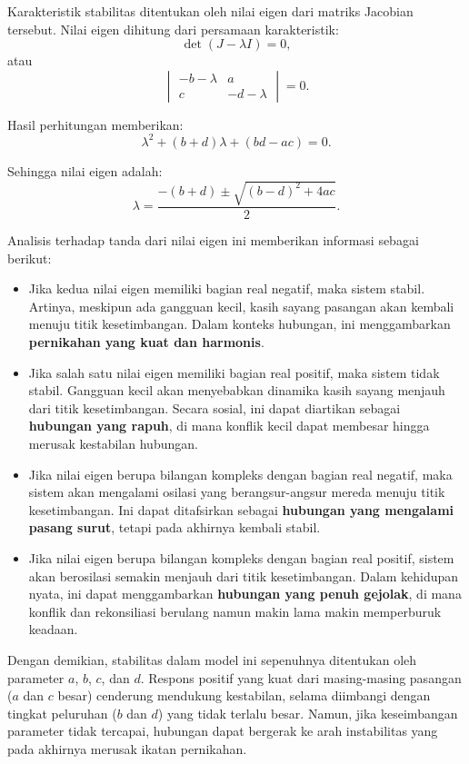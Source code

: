 \documentclass{bukumjh}
\begin{document}
Karakteristik stabilitas ditentukan oleh nilai eigen dari matriks Jacobian tersebut. 
Nilai eigen dihitung dari persamaan karakteristik:
\[
\det(J - \lambda I) = 0,
\]
atau
\[
\begin{vmatrix}
-b - \lambda & a \\
c & -d - \lambda
\end{vmatrix} = 0.
\]

Hasil perhitungan memberikan:
\[
\lambda^2 + (b+d)\lambda + (bd - ac) = 0.
\]

Sehingga nilai eigen adalah:
\[
\lambda = \frac{-(b+d) \pm \sqrt{(b-d)^2 + 4ac}}{2}.
\]

Analisis terhadap tanda dari nilai eigen ini memberikan informasi sebagai berikut:
\begin{itemize}
  \item Jika kedua nilai eigen memiliki bagian real negatif, maka sistem stabil. 
  Artinya, meskipun ada gangguan kecil, kasih sayang pasangan akan kembali menuju titik kesetimbangan. 
  Dalam konteks hubungan, ini menggambarkan \textbf{pernikahan yang kuat dan harmonis}.
  \item Jika salah satu nilai eigen memiliki bagian real positif, maka sistem tidak stabil. 
  Gangguan kecil akan menyebabkan dinamika kasih sayang menjauh dari titik kesetimbangan. 
  Secara sosial, ini dapat diartikan sebagai \textbf{hubungan yang rapuh}, di mana konflik kecil dapat membesar hingga merusak kestabilan hubungan.
  \item Jika nilai eigen berupa bilangan kompleks dengan bagian real negatif, maka sistem akan mengalami osilasi yang berangsur-angsur mereda menuju titik kesetimbangan. 
  Ini dapat ditafsirkan sebagai \textbf{hubungan yang mengalami pasang surut}, tetapi pada akhirnya kembali stabil.
  \item Jika nilai eigen berupa bilangan kompleks dengan bagian real positif, sistem akan berosilasi semakin menjauh dari titik kesetimbangan. 
  Dalam kehidupan nyata, ini dapat menggambarkan \textbf{hubungan yang penuh gejolak}, di mana konflik dan rekonsiliasi berulang namun makin lama makin memperburuk keadaan.
\end{itemize}

Dengan demikian, stabilitas dalam model ini sepenuhnya ditentukan oleh parameter $a$, $b$, $c$, dan $d$. 
Respons positif yang kuat dari masing-masing pasangan ($a$ dan $c$ besar) cenderung mendukung kestabilan, selama diimbangi dengan tingkat peluruhan ($b$ dan $d$) yang tidak terlalu besar. 
Namun, jika keseimbangan parameter tidak tercapai, hubungan dapat bergerak ke arah instabilitas yang pada akhirnya merusak ikatan pernikahan.
\end{document}
